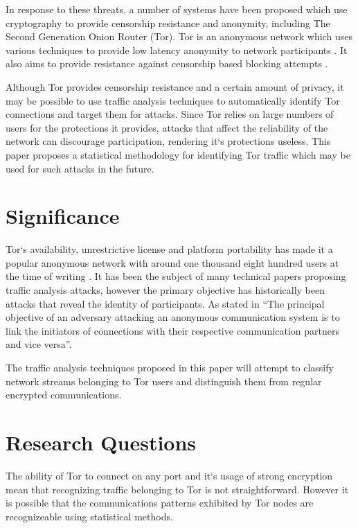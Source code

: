 \documentclass{conference}
\begin{document}
In response to these threats, a number of systems have been proposed which use cryptography to provide censorship resistance and anonymity, including The Second Generation Onion Router (Tor). Tor is an anonymous network which uses various techniques to provide low latency anonymity to network participants \citep{Dingledine:2004p314}. It also aims to provide resistance against censorship based blocking attempts \citep{Dingledine:2008p1542}.

Although Tor provides censorship resistance and a certain amount of privacy, it may be possible to use traffic analysis techniques to automatically identify Tor connections and target them for attacks. Since Tor relies on large numbers of users for the protections it provides, attacks that affect the reliability of the network can discourage participation, rendering it`s protections useless. This paper proposes a statistical methodology for identifying Tor traffic which may be used for such attacks in the future.

\section{Significance}

Tor`s availability, unrestrictive license and platform portability has made it a popular anonymous network with around one thousand eight hundred users at the time of writing \citep{website:tor-anonymity-online}. It has been the subject of many technical papers proposing traffic analysis attacks, however the primary objective has historically been attacks that reveal the identity of participants. As stated in \citet{Murdoch:2005p325} ``The principal objective of an adversary attacking an anonymous communication system is to link the initiators of connections with their respective communication partners and vice versa''.

The traffic analysis techniques proposed in this paper will attempt to classify network streams belonging to Tor users and distinguish them from regular encrypted communications.

\section{Research Questions}

The ability of Tor to connect on any port and it`s usage of strong encryption mean that recognizing traffic belonging to Tor is not straightforward. However it is possible that the communications patterns exhibited by Tor nodes are recognizeable using statistical methods.
\end{document}
